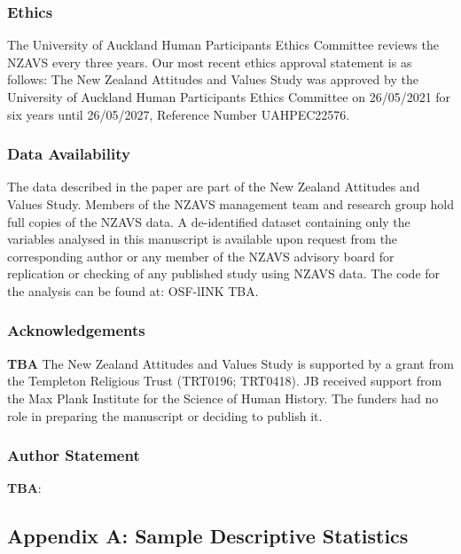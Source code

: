 \documentclass[
  single column]{article}
\begin{document}
\newpage{}

\subsubsection{Ethics}\label{ethics}

The University of Auckland Human Participants Ethics Committee reviews
the NZAVS every three years. Our most recent ethics approval statement
is as follows: The New Zealand Attitudes and Values Study was approved
by the University of Auckland Human Participants Ethics Committee on
26/05/2021 for six years until 26/05/2027, Reference Number UAHPEC22576.

\subsubsection{Data Availability}\label{data-availability}

The data described in the paper are part of the New Zealand Attitudes
and Values Study. Members of the NZAVS management team and research
group hold full copies of the NZAVS data. A de-identified dataset
containing only the variables analysed in this manuscript is available
upon request from the corresponding author or any member of the NZAVS
advisory board for replication or checking of any published study using
NZAVS data. The code for the analysis can be found at: OSF-lINK TBA.

\subsubsection{Acknowledgements}\label{acknowledgements}

\textbf{TBA} The New Zealand Attitudes and Values Study is supported by
a grant from the Templeton Religious Trust (TRT0196; TRT0418). JB
received support from the Max Plank Institute for the Science of Human
History. The funders had no role in preparing the manuscript or deciding
to publish it.

\subsubsection{Author Statement}\label{author-statement}

\textbf{TBA}:

\newpage{}

\subsection{Appendix A: Sample Descriptive Statistics}\label{appendix-a}
\end{document}
